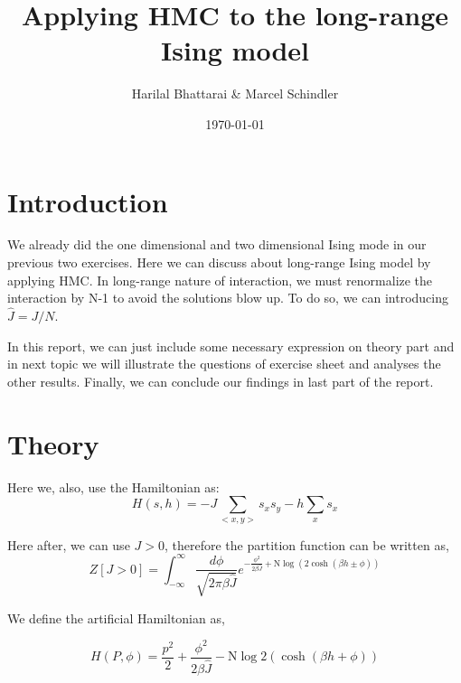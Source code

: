\documentclass[11pt, a4paper, DIV=12]{scrartcl}
\title{Applying HMC to the long-range Ising model}
\date{\today}
\author{Harilal Bhattarai \& Marcel Schindler}
\begin{document}
	\maketitle
\section{Introduction}

We already did the one dimensional and two dimensional Ising mode in our previous two exercises. Here we can discuss about long-range Ising model by applying HMC. In long-range nature of interaction, we must renormalize the interaction by N-1 to avoid the solutions blow up. To do so, we can introducing  $ \hat{J}=J/N $.

In this report, we can just include some necessary expression on theory part and in next topic we will illustrate the questions of exercise sheet and analyses the other results. Finally, we can conclude our findings in last part of the report.
\section{Theory}
Here we, also, use the Hamiltonian as:
\begin{equation}
H(s, h)= -J \sum_{<x,y>}s_{x}s_{y} - h \sum_{x}s_{x}
\end{equation}

Here after, we can use $ J > 0 $, therefore the partition function can be written as,
\begin{equation}
Z[J>0]=\int_{-\infty}^{\infty}\frac{d\phi}{\sqrt{2\pi \beta \hat{J}}} e^{-\frac{\phi^2}{2\beta \hat{J}} + \text{N}\log(2\cosh(\beta h \pm \phi))}
\end{equation}

We define the artificial Hamiltonian as,

\begin{equation}
{H(P, \phi)}= \frac{p^2}{2} + \frac{\phi^2}{2\beta \hat{J}} - \text{N}\log 2(\cosh(\beta h + \phi))
\label{equ:ArtificialH}
\end{equation}
\end{document}
